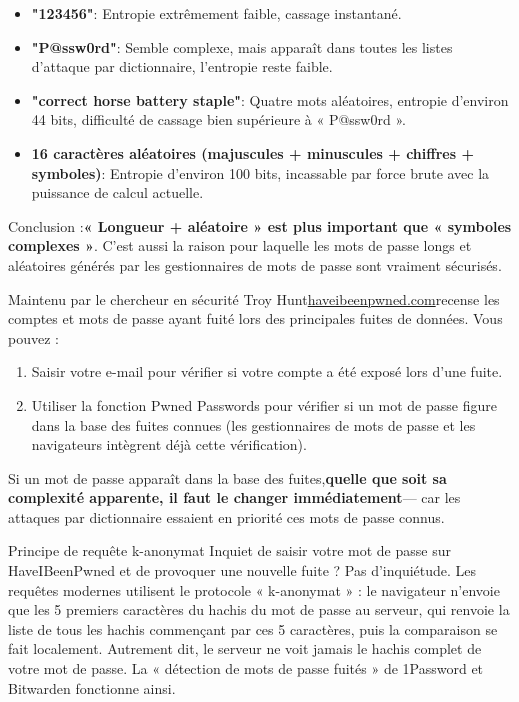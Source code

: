 \begin{itemize}
  \item \textbf{"123456"}: Entropie extrêmement faible, cassage instantané.
  \item \textbf{"P@ssw0rd"}: Semble complexe, mais apparaît dans toutes les listes d'attaque par dictionnaire, l'entropie reste faible.
  \item \textbf{"correct horse battery staple"}: Quatre mots aléatoires, entropie d'environ 44 bits, difficulté de cassage bien supérieure à « P@ssw0rd ».
  \item \textbf{16 caractères aléatoires (majuscules + minuscules + chiffres + symboles)}: Entropie d'environ 100 bits, incassable par force brute avec la puissance de calcul actuelle.
\end{itemize}

Conclusion :\textbf{« Longueur + aléatoire » est plus important que « symboles complexes »}. C'est aussi la raison pour laquelle les mots de passe longs et aléatoires générés par les gestionnaires de mots de passe sont vraiment sécurisés.


Maintenu par le chercheur en sécurité Troy Hunt\href{https://haveibeenpwned.com}{haveibeenpwned.com}recense les comptes et mots de passe ayant fuité lors des principales fuites de données. Vous pouvez :

\begin{enumerate}
  \item Saisir votre e-mail pour vérifier si votre compte a été exposé lors d'une fuite.
  \item Utiliser la fonction Pwned Passwords pour vérifier si un mot de passe figure dans la base des fuites connues (les gestionnaires de mots de passe et les navigateurs intègrent déjà cette vérification).
\end{enumerate}

Si un mot de passe apparaît dans la base des fuites,\textbf{quelle que soit sa complexité apparente, il faut le changer immédiatement}— car les attaques par dictionnaire essaient en priorité ces mots de passe connus.

\begin{tcbinfo}{Principe de requête k-anonymat}
Inquiet de saisir votre mot de passe sur HaveIBeenPwned et de provoquer une nouvelle fuite ? Pas d'inquiétude. Les requêtes modernes utilisent le protocole « k-anonymat » : le navigateur n'envoie que les 5 premiers caractères du hachis du mot de passe au serveur, qui renvoie la liste de tous les hachis commençant par ces 5 caractères, puis la comparaison se fait localement. Autrement dit, le serveur ne voit jamais le hachis complet de votre mot de passe. La « détection de mots de passe fuités » de 1Password et Bitwarden fonctionne ainsi.

\end{tcbinfo}

